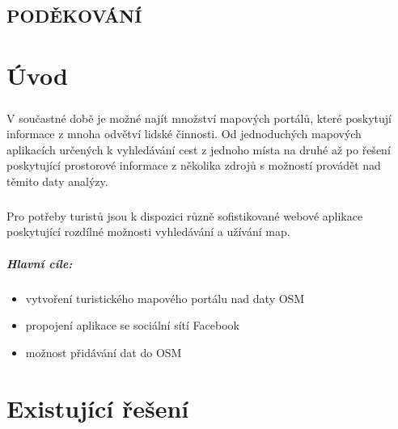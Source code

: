 \documentclass[11pt,a4paper,titlepage,oneside]{book}
\begin{document}
\newpage %
	\vspace*{15cm}
	\section*{\Large PODĚKOVÁNÍ}
	\paragraph{}
		
\renewcommand{\baselinestretch}{1.5} %
\newpage %
\pagestyle{plain}
\setcounter{page}{5}

	\tableofcontents

\newpage %
	\listoffigures
	\listoftables


\newpage %
\chapter*{Úvod}
	\paragraph{} V součastné době je možné najít množství mapových portálů, které poskytují informace z mnoha odvětví lidské činnosti. Od jednoduchých mapových aplikacích určených k vyhledávání cest z jednoho místa na druhé až po řešení poskytující prostorové informace z několika zdrojů s možností provádět nad těmito daty analýzy. 
	\paragraph{} Pro potřeby turistů jsou k dispozici různě sofistikované webové aplikace poskytující rozdílné možnosti vyhledávání a užívání map.

	\paragraph{Hlavní cíle:}
	\begin{itemize}
		\item vytvoření turistického mapového portálu nad daty OSM
		\item propojení aplikace se sociální sítí Facebook
		\item možnost přidávání dat do OSM
	\end{itemize}



\pagestyle{fancy}
\chapter{Existující řešení}
\end{document}
